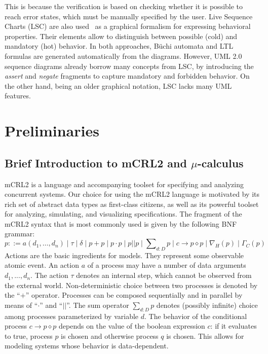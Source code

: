 \documentclass[letter]{llncs}
\begin{document}
This is because the verification is based on checking whether it is possible to reach error states, which must be manually specified by the user.
Live Sequence Charts (LSC) are also used~\cite{Kugler:2005:TLS:2140653.2140692,MVPSA} as a graphical formalism for expressing behavioral properties.
Their elements allow to distinguish between possible (cold) and mandatory (hot) behavior.
In both approaches, B\"uchi automata and LTL formulas are generated automatically from the diagrams.
However, UML 2.0 sequence diagrams already borrow many concepts from LSC, by introducing the \emph{assert} and \emph{negate} fragments
to capture mandatory and forbidden behavior. On the other hand, being an older graphical notation, LSC lacks many UML features.

\section{Preliminaries}
\label{sec:Preliminaries}

\subsection{Brief Introduction to mCRL2 and $\mu$-calculus}
mCRL2 is a language and accompanying toolset for specifying and analyzing concurrent systems. 
Our choice for using the mCRL2 language is motivated by its rich set of 
abstract data types as first-class citizens, as well as its powerful toolset for analyzing, simulating, and visualizing specifications. 
The fragment of the mCRL2 syntax that is most commonly used is given by the following BNF grammar:
\[p ::= a(d_1,\dots,d_n) \mid \tau \mid \delta \mid p+p \mid p\cdot p \mid p||p \mid \sum\nolimits_{d:D}p \mid c\rightarrow p\diamond p \mid \nabla_H(p) \mid \Gamma_C(p)
\]
Actions are the basic ingredients for models. They represent some observable
atomic event. An action $a$ of a process may have a number of data arguments  \begin{math}d_1,...,d_n\end{math}.
The action ${\tau}$ denotes an internal step, which cannot be observed from the external world. 
Non-deterministic choice between two processes
is denoted by the ``$+$'' operator. Processes can be composed sequentially and in parallel by means of ``$\cdot$'' and
``${||}$''. The sum
operator $\sum_{d:D}p$ denotes (possibly infinite) choice among
processes parameterized by variable $d$. The behavior of the conditional process $c\rightarrow p\diamond p$ 
depends on the value of the boolean expression $c$: if it evaluates to true, process $p$
is chosen and otherwise process $q$ is chosen.
This allows for modeling systems whose behavior is data-dependent.
\end{document}
